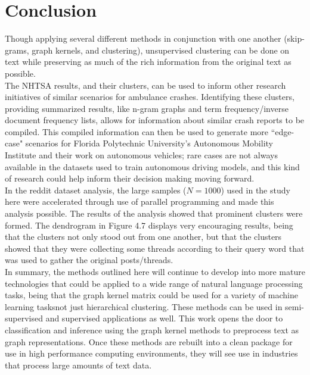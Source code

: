 %
%
%

\chapter{Conclusion}

\hspace*{0.3cm} Though applying several different methods in conjunction with one another (skip-grams, graph kernels, and clustering), unsupervised clustering can be done on text while preserving as much of the rich information from the original text as possible. \\

The NHTSA results, and their clusters, can be used to inform other research initiatives of similar scenarios for ambulance crashes. Identifying these clusters, providing summarized results, like n-gram graphs and term frequency/inverse document frequency lists, allows for information about similar crash reports to be compiled. This compiled information can then be used to generate more ``edge-case" scenarios for Florida Polytechnic University's Autonomous Mobility Institute and their work on autonomous vehicles; rare cases are not always available in the datasets used to train autonomous driving models, and this kind of research could help inform their decision making moving forward.\\

In the reddit dataset analysis, the large samples ($N=1000$) used in the study here were accelerated through use of parallel programming and made this analysis possible. The results of the analysis showed that prominent clusters were formed. The dendrogram in Figure 4.7 displays very encouraging results, being that the clusters not only stood out from one another, but that the clusters showed that they were collecting some threads according to their query word that was used to gather the original posts/threads. \\

In summary, the methods outlined here will continue to develop into more mature technologies that could be applied to a wide range of natural language processing tasks, being that the graph kernel matrix could be used for a variety of machine learning tasks\textemdash not just hierarchical clustering. These methods can be used in semi-supervised and supervised applications as well. This work opens the door to classification and inference using the graph kernel methods to preprocess text as graph representations.  Once these methods are rebuilt into a clean package for use in high performance computing environments, they will see use in industries that process large amounts of text data.\\

